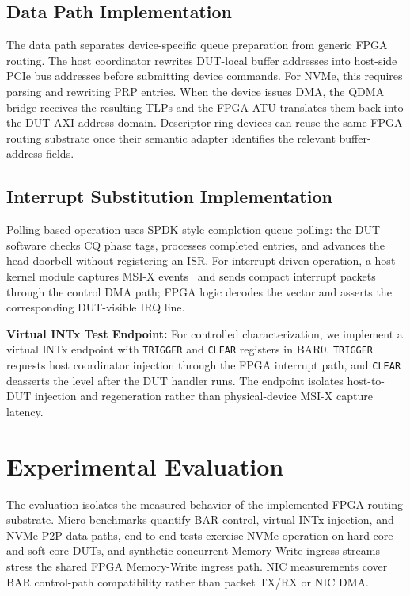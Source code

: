 \documentclass[10pt,conference,letterpaper]{IEEEtran}
\begin{document}
\subsection{Data Path Implementation}
\label{sec:impl_data}

The data path separates device-specific queue preparation from generic FPGA routing. The host coordinator rewrites DUT-local buffer addresses into host-side PCIe bus addresses before submitting device commands. For NVMe, this requires parsing and rewriting PRP entries. When the device issues DMA, the QDMA bridge receives the resulting TLPs and the FPGA ATU translates them back into the DUT AXI address domain. Descriptor-ring devices can reuse the same FPGA routing substrate once their semantic adapter identifies the relevant buffer-address fields.

\subsection{Interrupt Substitution Implementation}
\label{sec:impl_interrupt}

Polling-based operation uses SPDK-style completion-queue polling: the DUT software checks CQ phase tags, processes completed entries, and advances the head doorbell without registering an ISR. For interrupt-driven operation, a host kernel module captures MSI-X events~\cite{budruk2004pci} and sends compact interrupt packets through the control DMA path; FPGA logic decodes the vector and asserts the corresponding DUT-visible IRQ line.

\textbf{Virtual INTx Test Endpoint:}
For controlled characterization, we implement a virtual INTx endpoint with \texttt{TRIGGER} and \texttt{CLEAR} registers in BAR0. \texttt{TRIGGER} requests host coordinator injection through the FPGA interrupt path, and \texttt{CLEAR} deasserts the level after the DUT handler runs. The endpoint isolates host-to-DUT injection and regeneration rather than physical-device MSI-X capture latency.

\section{Experimental Evaluation}

The evaluation isolates the measured behavior of the implemented FPGA routing substrate. Micro-benchmarks quantify BAR control, virtual INTx injection, and NVMe P2P data paths, end-to-end tests exercise NVMe operation on hard-core and soft-core DUTs, and synthetic concurrent Memory Write ingress streams stress the shared FPGA Memory-Write ingress path. NIC measurements cover BAR control-path compatibility rather than packet TX/RX or NIC DMA.
\end{document}
